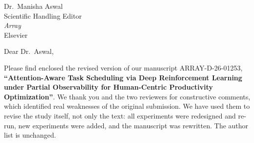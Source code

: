 \documentclass[11pt]{letter}
\date{\today}
\begin{document}
\begin{letter}{Dr.\ Manisha Aswal\\Scientific Handling Editor\\\textit{Array}\\Elsevier}
\opening{Dear Dr.\ Aswal,}

Please find enclosed the revised version of our manuscript ARRAY-D-26-01253, \textbf{``Attention-Aware Task Scheduling via Deep Reinforcement Learning under Partial Observability for Human-Centric Productivity Optimization''}. We thank you and the two reviewers for constructive comments, which identified real weaknesses of the original submission. We have used them to revise the study itself, not only the text: all experiments were redesigned and re-run, new experiments were added, and the manuscript was rewritten. The author list is unchanged.


\end{letter}
\end{document}
